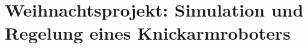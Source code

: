 \documentclass{MSM_latex}
\author{M. Denkinger, S. Eyes, J. Schnitzler}
\begin{document}
\section{Weihnachtsprojekt: Simulation und Regelung eines Knickarmroboters}






\newpage







% 
\end{document}
